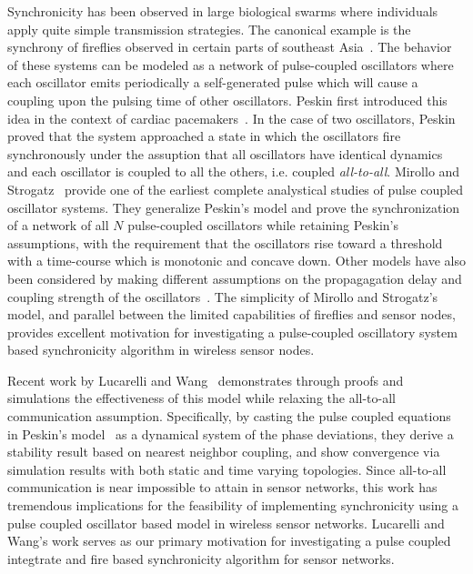 Synchronicity has been observed in large biological swarms where
individuals apply quite simple transmission strategies. The canonical example
is the synchrony of fireflies observed in certain parts of southeast
Asia~\cite{ms90}.  The behavior of these systems can be modeled as a network
of pulse-coupled oscillators where each oscillator emits periodically a
self-generated pulse which will cause a coupling upon the pulsing time of
other oscillators. Peskin first introduced this idea in the context of cardiac
pacemakers~\cite{peskin75}. In the case of two oscillators, Peskin proved that the system
approached a state in which the oscillators fire synchronously under the assuption
that all oscillators have identical dynamics and each oscillator is coupled
to all the others, i.e. coupled \emph{all-to-all}.
Mirollo and Strogatz~\cite{ms90} provide one of the earliest complete
analystical studies of pulse coupled oscillator systems. They generalize 
Peskin's model and prove the synchronization of a network of all $N$ pulse-coupled
oscillators while retaining Peskin's assumptions, with the requirement
that the oscillators rise toward a threshold with a time-course which is 
monotonic and concave down.  Other models have also been considered by
making different assumptions on the propagagation delay and coupling
strength of the oscillators~\cite{a90,g96}.
The simplicity of Mirollo and Strogatz's model, and parallel between the limited
capabilities of fireflies and sensor nodes, provides excellent motivation
for investigating a pulse-coupled oscillatory system based synchronicity
algorithm in wireless sensor nodes.

Recent work by Lucarelli and Wang~\cite{lw04} demonstrates through proofs 
and simulations the effectiveness of this model while relaxing 
the all-to-all communication assumption.  Specifically, by casting the
pulse coupled equations in Peskin's model~\cite{peskin75} as a dynamical
system of the phase deviations, they derive a stability result based
on nearest neighbor coupling, and show convergence via simulation results 
with both static and time varying topologies.  Since all-to-all communication
is near impossible to attain in sensor networks, this work has tremendous
implications for the feasibility of implementing synchronicity using 
a pulse coupled oscillator based model in wireless sensor networks.
Lucarelli and Wang's work serves as our primary motivation for investigating
a pulse coupled integtrate and fire based synchronicity algorithm for 
sensor networks.

